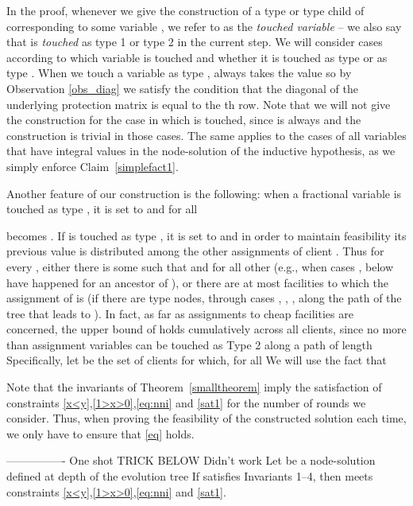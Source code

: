 \documentclass[11pt]{article}\usepackage{amsmath}
\makeatletter
\newenvironment{oneshot}[1]{\@beginlemma{#1}{\unskip}}{\@endlemma}
\makeatother
\begin{document}
In the proof, whenever we give the  construction of a type  or type  child
of    corresponding  to  some  variable  , we  refer  to    as  the
\emph{touched  variable} --  we also  say that   is
\emph{touched}  as type 1 or type 2 in the
current step.  We will consider cases according to which variable is touched and
whether it  is touched  as type   or as  type . When  we touch  a variable
  as type  ,    always takes  the  value   so  by
Observation \ref{obs_diag}  we satisfy  the condition that  the diagonal  of the
underlying protection matrix is equal to the th row.  Note that we will not  give
the construction  for the case in  which    is touched, since
 is  always  and  the construction is  trivial in those cases.  The same
applies  to  the  cases of  all  variables  that  have  integral values  in  the
node-solution  of the inductive hypothesis, as we simply 
enforce Claim~\ref{simplefact1}.
 
Another   feature of   our construction is  the following: when  a fractional
variable  is touched as type , it is set to   and for all
  
becomes . If  is touched as type , it is set to   and
in order to maintain feasibility 
its previous value is
distributed  among the  other assignments  of client  . Thus  for  every ,
either there is  some  such that   and for all other  
 (e.g.,  when cases ,   below have happened for  an ancestor of  ), or
there are at most  facilities to which the assignment of  is  (if there
are type  nodes,  through cases , , , along the  path of the tree
that leads  to ). 
In fact, as far as assignments to cheap facilities are concerned,
the upper bound of  holds cumulatively  across all clients,
since 
no more than   assignment variables can be touched as Type 2 along  a
path of length  
Specifically, 
let  be the set of clients  for which, for all   
We will use the fact that  



Note  that  the  invariants of    Theorem~\ref{smalltheorem}  imply the  satisfaction  of
constraints  \eqref{x<y},\eqref{1>x>0},\eqref{eq:nni} and  \eqref{sat1}  for the
number  of  rounds  we consider.  Thus,  when  proving  the feasibility  of  the
constructed solution each time, we only have to ensure that \eqref{eq} holds.




\iffalse ---------------- One shot TRICK BELOW Didn't work
\begin{oneshot}{Lemma~\ref{easyconstraints2}}
Let    be a node-solution defined  at   depth   of the evolution tree   If  satisfies
Invariants 1--4, then  meets 
constraints \eqref{x<y},\eqref{1>x>0},\eqref{eq:nni} and \eqref{sat1}.
\end{oneshot}
\end{document}

